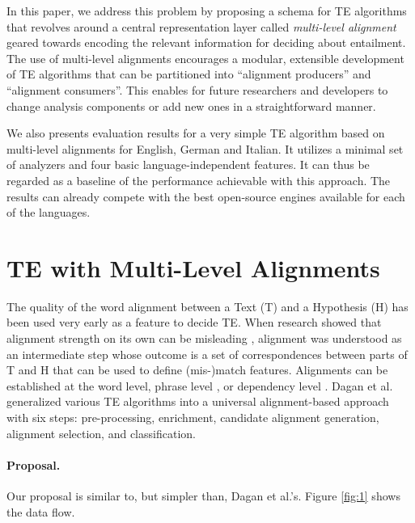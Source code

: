 \documentclass[11pt,letterpaper]{article}
\begin{document}


In this paper, we address this problem by proposing a schema for TE
algorithms that revolves around a central representation layer called
{\em multi-level alignment} geared towards encoding the relevant
information for deciding about entailment. The use of multi-level
alignments encourages a modular, extensible development of TE
algorithms that can be partitioned into ``alignment producers'' and
``alignment consumers''. This enables for future researchers
and developers to change analysis components or add new ones in a
straightforward manner.

We also presents evaluation results for a very simple TE algorithm
based on multi-level alignments for English, German and Italian. It
utilizes a minimal set of analyzers and four basic
language-independent features. It can thus be regarded as a baseline
of the performance achievable with this approach.  The results can
already compete with the best open-source engines available for each
of the languages.

\section{TE with Multi-Level Alignments}

The quality of the word alignment between a Text (T) and a Hypothesis
(H) has been used very early as a feature to decide TE. When research
showed that alignment strength on its own can be misleading
\cite{maccartney-EtAl:2006:HLT-NAACL06-Main}, alignment was 
understood as an intermediate step whose outcome is a set of
correspondences between parts of T and H that can be used to define
(mis-)match features. Alignments can be established at the
word level, phrase level \cite{MacCartney:EMNLP08}, or dependency
level \cite{dinu-wang:2009:EACL}. Dagan et
al.  generalized various TE algorithms into
a universal alignment-based approach with six steps: pre-processing,
enrichment, candidate alignment generation, alignment selection, and
classification. 

\paragraph{Proposal.} Our proposal is similar to, but simpler than,
Dagan et al.'s. Figure \ref{fig:1} shows the data flow.
\end{document}

